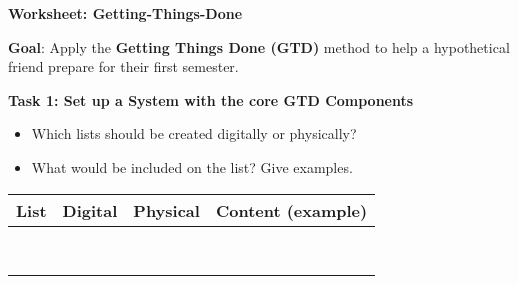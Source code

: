 \documentclass[11pt]{scrartcl}
\theoremstyle{aufgabenstyle}
\begin{document}
\begin {center}\textbf{{\Large Worksheet: Getting-Things-Done}}\\
\end{center}

\textbf{Goal}: Apply the \textbf{Getting Things Done (GTD)} method to help a hypothetical friend prepare for their first semester.


\textbf{\large{Task 1: Set up a System with the core GTD Components}}

\begin{itemize}
	\item Which lists should be created digitally or physically?
	\item What would be included on the list? Give examples.
\end{itemize}


\renewcommand{\arraystretch}{2.5} %
\begin{table}[htbp]
	\centering
	\begin{tabular}{|p{3cm}|p{3cm}|p{3cm}|p{5cm}|}
		\hline
		\textbf{List} & \textbf{Digital} & \textbf{Physical} & \textbf{Content (example)} \\
		\hline
		 &  &  &  \\ \hline
		 &  &  &  \\ \hline
		 &  &  &  \\ \hline
		 &  &  &  \\ \hline
		 &  &  &  \\ \hline
		 &  &  &  \\ \hline
		 &  &  &  \\ \hline
		 &  &  &  \\ \hline


	\end{tabular}
\end{table}
\end{document}

